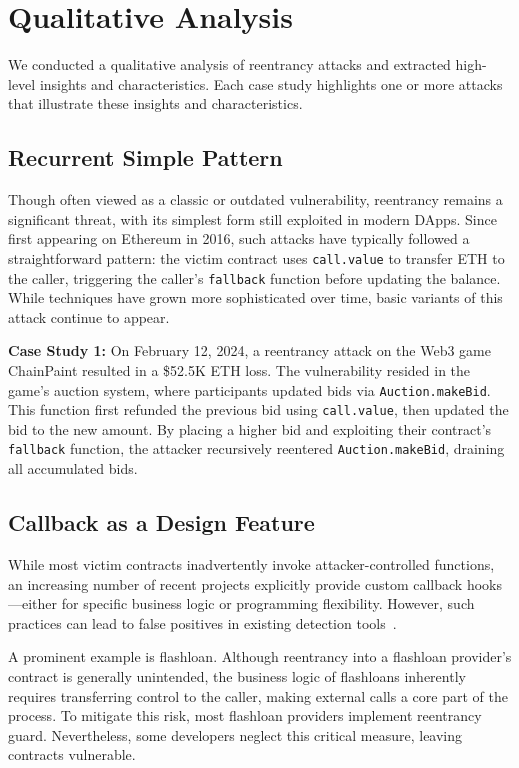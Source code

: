 \section{Qualitative Analysis}

We conducted a qualitative analysis of reentrancy attacks and extracted high-level insights and characteristics. Each case study highlights one or more attacks that illustrate these insights and characteristics.


\subsection{Recurrent Simple Pattern}
\label{recurrent-simple-pattern}

Though often viewed as a classic or outdated vulnerability, reentrancy remains a significant threat, with its simplest form still exploited in modern DApps. Since first appearing on Ethereum in 2016, such attacks have typically followed a straightforward pattern: the victim contract uses \lstinline{call.value} to transfer ETH to the caller, triggering the caller's \lstinline{fallback} function before updating the balance. While techniques have grown more sophisticated over time, basic variants of this attack continue to appear.

\textbf{Case Study 1:} \label{case-study:1} On February 12, 2024, a reentrancy attack on the Web3 game ChainPaint resulted in a \$52.5K ETH loss. The vulnerability resided in the game's auction system, where participants updated bids via \lstinline{Auction.makeBid}. This function first refunded the previous bid using \lstinline{call.value}, then updated the bid to the new amount. By placing a higher bid and exploiting their contract's \lstinline{fallback} function, the attacker recursively reentered \lstinline{Auction.makeBid}, draining all accumulated bids.


\subsection{Callback as a Design Feature}
\label{callback-as-a-design-feature}

While most victim contracts inadvertently invoke attacker-controlled functions, an increasing number of recent projects explicitly provide custom callback hooks—either for specific business logic or programming flexibility. However, such practices can lead to false positives in existing detection tools~\cite{rethinking-of-reentrancy}.

A prominent example is flashloan. Although reentrancy into a flashloan provider's contract is generally unintended, the business logic of flashloans inherently requires transferring control to the caller, making external calls a core part of the process. To mitigate this risk, most flashloan providers implement reentrancy guard. Nevertheless, some developers neglect this critical measure, leaving contracts vulnerable.

